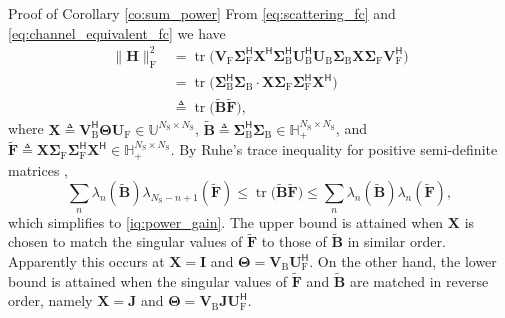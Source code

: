 \documentclass[journal]{IEEEtran}
\DeclareMathOperator{\tr}{tr}
\begin{document}
\begin{appendix}
	\begin{subsection}{Proof of Corollary \ref{co:sum_power}}\label{ap:sum_power}
		From \eqref{eq:scattering_fc} and \eqref{eq:channel_equivalent_fc} we have
		\begin{equation}
			\begin{split}
				\lVert \mathbf{H} \rVert _\mathrm{F}^2
				& = \tr \bigl(\mathbf{V}_\mathrm{F} \mathbf{\Sigma}_\mathrm{F}^\mathsf{H} \mathbf{X}^\mathsf{H} \mathbf{\Sigma}_\mathrm{B}^\mathsf{H} \mathbf{U}_\mathrm{B}^\mathsf{H} \mathbf{U}_\mathrm{B} \mathbf{\Sigma}_\mathrm{B} \mathbf{X} \mathbf{\Sigma}_\mathrm{F} \mathbf{V}_\mathrm{F}^\mathsf{H}\bigr) \\
				& = \tr \bigl(\mathbf{\Sigma}_\mathrm{B}^\mathsf{H} \mathbf{\Sigma}_\mathrm{B} \cdot \mathbf{X} \mathbf{\Sigma}_\mathrm{F} \mathbf{\Sigma}_\mathrm{F}^\mathsf{H} \mathbf{X}^\mathsf{H}\bigr) \\
				& \triangleq \tr \bigl(\tilde{\mathbf{B}} \tilde{\mathbf{F}}\bigr),
			\end{split}
			\label{eq:channel_power_gain}
		\end{equation}
		where $\mathbf{X} \triangleq \mathbf{V}_\mathrm{B}^\mathsf{H} \mathbf{\Theta} \mathbf{U}_\mathrm{F} \in \mathbb{U}^{N_\mathrm{S} \times N_\mathrm{S}}$, $\tilde{\mathbf{B}} \triangleq \mathbf{\Sigma}_\mathrm{B}^\mathsf{H} \mathbf{\Sigma}_\mathrm{B} \in \mathbb{H}_+^{N_\mathrm{S} \times N_\mathrm{S}}$, and $\tilde{\mathbf{F}} \triangleq \mathbf{X} \mathbf{\Sigma}_\mathrm{F} \mathbf{\Sigma}_\mathrm{F}^\mathsf{H} \mathbf{X}^\mathsf{H} \in \mathbb{H}_+^{N_\mathrm{S} \times N_\mathrm{S}}$.
		By Ruhe's trace inequality for positive semi-definite matrices \cite[(H.1.g) and (H.1.h)]{Marshall2010},
		\begin{equation*}
			\sum_n \lambda_n(\tilde{\mathbf{B}}) \lambda_{N_\mathrm{S}-n+1}(\tilde{\mathbf{F}}) \le \tr \bigl(\tilde{\mathbf{B}} \tilde{\mathbf{F}}\bigr) \le \sum_n \lambda_n(\tilde{\mathbf{B}}) \lambda_n(\tilde{\mathbf{F}}),
		\end{equation*}
		which simplifies to \eqref{iq:power_gain}.
		The upper bound is attained when $\mathbf{X}$ is chosen to match the singular values of $\tilde{\mathbf{F}}$ to those of $\tilde{\mathbf{B}}$ in similar order.
		Apparently this occurs at $\mathbf{X} = \mathbf{I}$ and $\mathbf{\Theta} = \mathbf{V}_\mathrm{B} \mathbf{U}_\mathrm{F}^\mathsf{H}$.
		On the other hand, the lower bound is attained when the singular values of $\tilde{\mathbf{F}}$ and $\tilde{\mathbf{B}}$ are matched in reverse order, namely $\mathbf{X} = \mathbf{J}$ and $\mathbf{\Theta} = \mathbf{V}_\mathrm{B} \mathbf{J} \mathbf{U}_\mathrm{F}^\mathsf{H}$.
	\end{subsection}


\end{appendix}
\end{document}
